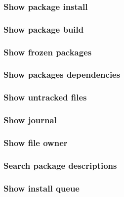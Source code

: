 \newpage
\subsubsection{Show package install}


\newpage
\subsubsection{Show package build}


\newpage
\subsubsection{Show frozen packages}


\newpage
\subsubsection{Show packages dependencies}


\newpage
\subsubsection{Show untracked files}


\newpage
\subsubsection{Show journal}


\newpage
\subsubsection{Show file owner}


\newpage
\subsubsection{Search package descriptions}


\newpage
\subsubsection{Show install queue}



